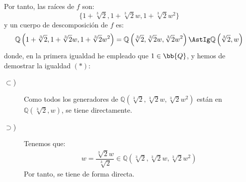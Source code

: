 \begin{ejercicio}
    Por tanto, las raíces de $f$ son:
    \begin{equation*}
        \{1+\sqrt[3]{2}, 1+\sqrt[3]{2}w, 1+\sqrt[3]{2}w^2\}
    \end{equation*}
    y un cuerpo de descomposición de $f$ es:
    \begin{equation*}
        \mathbb{Q}\left(1+\sqrt[3]{2}, 1+\sqrt[3]{2}w, 1+\sqrt[3]{2}w^2\right) = \mathbb{Q}\left(\sqrt[3]{2}, \sqrt[3]{2}w, \sqrt[3]{2}w^2\right) \AstIg \mathbb{Q}\left(\sqrt[3]{2}, w\right)
    \end{equation*}
    donde, en la primera igualdad he empleado que $1\in \bb{Q}$, y hemos de demostrar la igualdad $(\ast)$:
    \begin{description}
        \item[$\subset$)] Como todos los generadores de $\mathbb{Q}\left(\sqrt[3]{2}, \sqrt[3]{2}w, \sqrt[3]{2}w^2\right)$ están en $\mathbb{Q}\left(\sqrt[3]{2}, w\right)$, se tiene directamente.
        \item[$\supset$)] Tenemos que:
        \begin{align*}
            w=\dfrac{\sqrt[3]{2}w}{\sqrt[3]{2}} \in \mathbb{Q}\left(\sqrt[3]{2}, \sqrt[3]{2}w, \sqrt[3]{2}w^2\right)
        \end{align*}
        Por tanto, se tiene de forma directa.
    \end{description}
\end{ejercicio}

